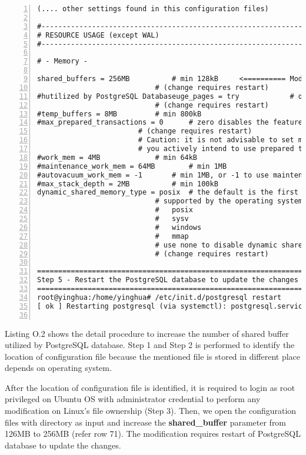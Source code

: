 \begin{lstlisting}[breaklines, frame=single, numbers=left, caption={Increase Shared Buffer utilized by PostgreSQL Database}, label=commandline-02]
(.... other settings found in this configuration files) 

#------------------------------------------------------------------------------
# RESOURCE USAGE (except WAL)
#------------------------------------------------------------------------------

# - Memory -

shared_buffers = 256MB			# min 128kB		<========== Modify from 128MB to 256MB 
							# (change requires restart)
#hutilized by PostgreSQL Databaseuge_pages = try			# on, off, or try
							# (change requires restart)
#temp_buffers = 8MB			# min 800kB
#max_prepared_transactions = 0		# zero disables the feature
						# (change requires restart)
						# Caution: it is not advisable to set max_prepared_transactions nonzero unless
						# you actively intend to use prepared transactions.
#work_mem = 4MB				# min 64kB
#maintenance_work_mem = 64MB		# min 1MB
#autovacuum_work_mem = -1		# min 1MB, or -1 to use maintenance_work_mem
#max_stack_depth = 2MB			# min 100kB
dynamic_shared_memory_type = posix	# the default is the first option
							# supported by the operating system:
							#   posix
							#   sysv
							#   windows
							#   mmap
							# use none to disable dynamic shared memory
							# (change requires restart)
							
===================================================================================
Step 5 - Restart the PostgreSQL database to update the changes 
==================================================================================
root@yinghua:/home/yinghua# /etc/init.d/postgresql restart
[ ok ] Restarting postgresql (via systemctl): postgresql.service.


\end{lstlisting}

Listing O.2 shows the detail procedure to increase the number of shared buffer utilized by PostgreSQL database. Step 1 and Step 2 is performed to identify the location of configuration file because the mentioned file is stored in different place depends on operating system. 

After the location of configuration file is identified, it is required to login as root privileged on Ubuntu OS with administrator credential to perform any modification on Linux's file ownership (Step 3). Then, we open the configuration files with directory as input and increase the \textbf{shared\_buffer} parameter from 126MB to 256MB (refer row 71). The modification requires restart of PostgreSQL database to update the changes. 

